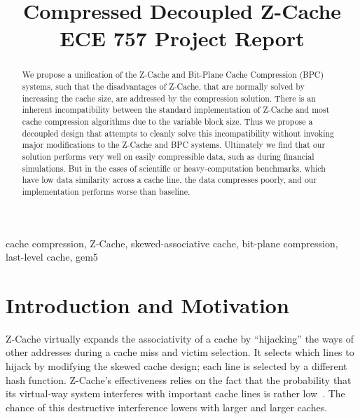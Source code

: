 \documentclass[conference]{IEEEtran}
\begin{document}
\title{Compressed Decoupled Z-Cache\\
{\footnotesize ECE 757 Project Report}
}

\author{
}

\maketitle

\begin{abstract}
We propose a unification of the Z-Cache and Bit-Plane Cache Compression (BPC)
systems, such that the disadvantages of Z-Cache, that are normally solved by
increasing the cache size, are addressed by the compression solution. There is
an inherent incompatibility between the standard implementation of Z-Cache and
most cache compression algorithms due to the variable block size. Thus we
propose a decoupled design that attempts to cleanly solve this incompatibility
without invoking major modifications to the Z-Cache and BPC systems. Ultimately
we find that our solution performs very well on easily compressible data, such
as during financial simulations. But in the cases of scientific or
heavy-computation benchmarks, which have low data similarity across a cache
line, the data compresses poorly, and our implementation performs worse than
baseline.
\end{abstract}

\begin{IEEEkeywords}
cache compression, Z-Cache, skewed-associative cache, bit-plane compression,
last-level cache, gem5
\end{IEEEkeywords}

\section{Introduction and Motivation}
Z-Cache virtually expands the associativity of a cache by ``hijacking'' the
ways of other addresses during a cache miss and victim selection. It selects
which lines to hijack by modifying the skewed cache design; each line is
selected by a different hash function. Z-Cache's effectiveness relies on the
fact that the probability that its virtual-way system interferes with important
cache lines is rather low~\cite{sanchez2010zcache}. The chance of this
destructive interference lowers with larger and larger caches.
\end{document}
